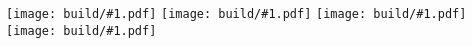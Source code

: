 \documentclass{article}
\newcommand{\Include}[1]{\texttt{[image: build/\#1.pdf]}\vspace{1cm}}
\begin{document}
\centering

\Include{abend-wird-es-wieder}
\Include{kein-schoener-land}
\Include{wenn-alle-bruennlein-fliessen}
\Include{wenn-ich-ein-voeglein-waer}
\end{document}

